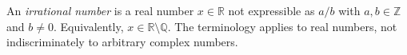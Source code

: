 
An \emph{irrational number} is a real number $x\in\mathbb R$ not expressible as $a/b$ with $a,b\in\mathbb Z$ and $b\ne0$. Equivalently, $x\in\mathbb R\setminus\mathbb Q$. The terminology applies to real numbers, not indiscriminately to arbitrary complex numbers.
